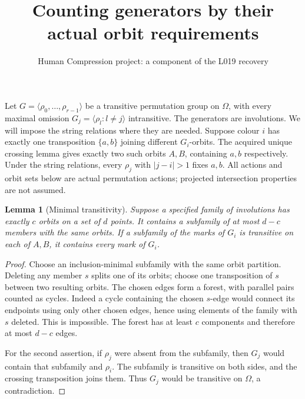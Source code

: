 \documentclass[11pt,a4paper]{article}
\title{Counting generators by their actual orbit requirements}
\author{Human Compression project: a component of the L019 recovery}
\date{}
\newtheorem{lemma}{Lemma}
\newcommand{\gen}[1]{\langle#1\rangle}
\begin{document}
\maketitle
Let $G=\gen{\rho_0,\ldots,\rho_{r-1}}$ be a transitive
permutation group on $\Omega$, with every maximal omission
$G_j=\gen{\rho_l:l\ne j}$ intransitive. The generators are
involutions. We will impose the string relations where they
are needed. Suppose colour $i$ has exactly one transposition
$\{a,b\}$ joining different $G_i$-orbits. The acquired unique
crossing lemma gives exactly two such orbits $A,B$, containing
$a,b$ respectively. Under the string relations, every
$\rho_j$ with $|j-i|>1$ fixes $a,b$. All actions and orbit sets below are actual permutation
actions; projected intersection properties are not assumed.

\begin{lemma}[Minimal transitivity]\label{minimal}
Suppose a specified family of involutions has exactly $c$
orbits on a set of $d$ points. It contains a subfamily of at
most $d-c$ members with the same orbits. If a subfamily of the
marks of $G_i$ is transitive on each of $A,B$, it contains
every mark of $G_i$.
\end{lemma}
\begin{proof}
Choose an inclusion-minimal subfamily with the same orbit
partition. Deleting any member $s$ splits one of its orbits;
choose one transposition of $s$ between two resulting orbits.
The chosen edges form a forest, with parallel pairs counted
as cycles. Indeed a cycle containing
the chosen $s$-edge would connect its endpoints using only
other chosen edges, hence using elements of the family with
$s$ deleted. This is impossible. The forest has at least
$c$ components and therefore at most $d-c$ edges.

For the second assertion, if $\rho_j$ were absent from the
subfamily, then $G_j$ would contain that subfamily and
$\rho_i$. The subfamily is transitive on both sides, and
the crossing transposition joins them. Thus $G_j$ would be
transitive on $\Omega$, a contradiction.
\end{proof}
\end{document}

